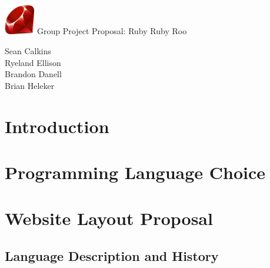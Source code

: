 \documentclass{article}
\begin{document}
\begin{titlepage}
  \centering %
  \vspace*{\fill} %
  
  \includegraphics[width=0.1\textwidth]{./ruby.png}
  \Huge Group Project Proposal: Ruby Ruby Roo

  \Large Sean Calkins \\
  \Large Ryeland Ellison \\
  \Large Brandon Danell \\
  \Large Brian Heleker

  \date{}
  
  \vspace*{\fill} %
\end{titlepage}




\section{Introduction}

\section{Programming Language Choice}

\section{Website Layout Proposal}

\subsection{Language Description and History}
\end{document}

